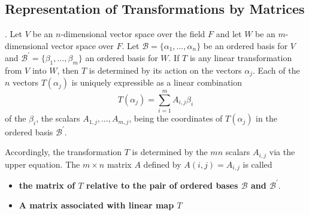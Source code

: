 \documentclass[8pt]{beamer}
\newcommand{\mc}[1]{\mathcal{#1}}
\newcommand{\tb}[1]{\textbf{#1}}
\begin{document}
\subsection{Representation of Transformations by Matrices}

\begin{frame}{.}
    Let $V$ be an $n$-dimensional vector space over the field $F$ and let $W$ be an $m$-dimensional vector space over $F$.
    Let $\mc{B} = \{\alpha_1, \dots, \alpha_n\}$ be an ordered basis for $V$ and $\mc{B}^\prime = \{\beta_1, \dots, \beta_m\}$ an ordered basis for $W$.
    If $T$ is any linear transformation from $V$ into $W$, then $T$ is determined by its action on the vectors $\alpha_j$.
    Each of the $n$ vectors $T(\alpha_j)$ is uniquely expressible as a linear combination
    \[
        T(\alpha_j) = \sum_{i=1}^m A_{i,j} \beta_i
    \]
    of the $\beta_i$, the scalars $A_{1,j}, \dots, A_{m,j}$, being the coordinates of $T(\alpha_j)$ in the ordered basis $\mc{B}^\prime$.

    Accordingly, the transformation $T$ is determined by the $mn$ scalars $A_{i,j}$ via the upper equation.
    The $m \times n$ matrix $A$ defined by $A(i,j) = A_{i,j}$ is called 
    \begin{itemize}
        \item \tb{the matrix of $T$ relative to the pair of ordered bases $\mc{B}$ and $\mc{B}^\prime$}.
        \item \tb{A matrix associated with linear map $T$}
    \end{itemize}
\end{frame}
\end{document}
